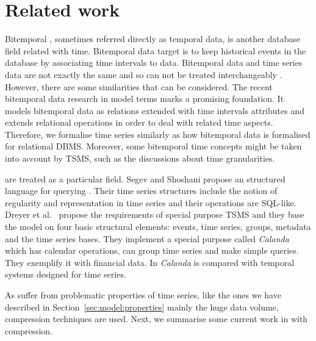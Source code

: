 

\section{Related work}
\label{sec:related-work}


Bitemporal , sometimes referred directly as temporal data,
is another database field related with time. Bitemporal data target is
to keep historical events in the database by associating time
intervals to data.  Bitemporal data and time series data are not
exactly the same and so can not be treated interchangeably
\cite{schmidt95}. However, there are some similarities that can be
considered.  The recent bitemporal data research in  model
terms \cite{jensen99:temporaldata,date02:_tempor_data_relat_model}
marks a promising foundation. It models bitemporal data as relations
extended with time intervals attributes and extends relational
operations in order to deal with related time aspects.  Therefore, we
formalise time series similarly as how bitemporal data is formalised
for relational DBMS. Moreover, some bitemporal time concepts might be
taken into account by TSMS, such as the discussions about time
granularities.


 are treated as a particular  field.  Segev and
Shoshani \cite{segev87:sigmod} propose an structured language for
querying . Their time series structures include the notion
of regularity and representation in time series and their operations
are SQL-like.  Dreyer et al.\ \cite{dreyer94} propose the requirements
of special purpose TSMS and they base the model on four basic
structural elements: events, time series, groups, metadata and the
time series bases. They implement a special purpose  called
\emph{Calanda} which has calendar operations, can group time series
and make simple queries. They exemplify it with financial data. In
\cite{schmidt95} \emph{Calanda} is compared with temporal systems
designed for time series.




As  suffer from problematic properties of time
series, like the ones we have described in
Section~\ref{sec:model:properties} mainly the huge data volume,
compression techniques are used.  Next, we summarise some current work
in  with compression.



